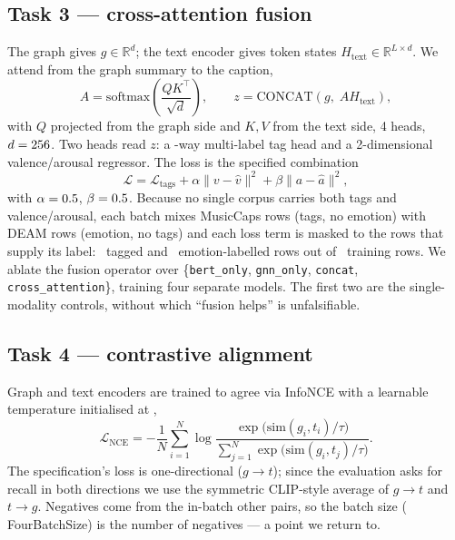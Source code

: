 \documentclass[10pt,a4paper]{article}
\begin{document}
\subsection{Task 3 --- cross-attention fusion}
The graph gives $g \in \mathbb{R}^{d}$; the text encoder gives token states
$H_{\text{text}} \in \mathbb{R}^{L \times d}$. We attend from the graph summary
to the caption,
\begin{equation}
A = \mathrm{softmax}\!\left(\frac{QK^{\top}}{\sqrt{d}}\right), \qquad
z = \mathrm{CONCAT}\!\left(g,\; A H_{\text{text}}\right),
\end{equation}
with $Q$ projected from the graph side and $K, V$ from the text side, 4 heads,
$d = 256$. Two heads read $z$: a \cfgNumTags-way multi-label tag head and a
2-dimensional valence/arousal regressor. The loss is the specified combination
\begin{equation}
\mathcal{L} = \mathcal{L}_{\text{tags}}
 + \alpha \lVert v - \hat{v} \rVert^{2}
 + \beta  \lVert a - \hat{a} \rVert^{2},
\end{equation}
with $\alpha = 0.5$, $\beta = 0.5$. Because no single corpus carries
both tags and valence/arousal, each batch mixes MusicCaps rows (tags, no emotion)
with DEAM rows (emotion, no tags) and each loss term is masked to the rows that
supply its label: \tThreeNTagTrain\ tagged and \tThreeNEmoTrain\ emotion-labelled
rows out of \tThreeNTrain\ training rows. We ablate the fusion operator over
\{\texttt{bert\_only}, \texttt{gnn\_only}, \texttt{concat},
\texttt{cross\_attention}\}, training four separate models. The first two are the
single-modality controls, without which ``fusion helps'' is unfalsifiable.

\subsection{Task 4 --- contrastive alignment}
Graph and text encoders are trained to agree via InfoNCE with a learnable
temperature initialised at \cfgTemp,
\begin{equation}
\mathcal{L}_{\text{NCE}} = -\frac{1}{N}\sum_{i=1}^{N}
\log \frac{\exp\!\big(\mathrm{sim}(g_i, t_i)/\tau\big)}
          {\sum_{j=1}^{N} \exp\!\big(\mathrm{sim}(g_i, t_j)/\tau\big)}.
\end{equation}
The specification's loss is one-directional ($g \to t$); since the evaluation
asks for recall in both directions we use the symmetric CLIP-style average of
$g \to t$ and $t \to g$. Negatives come from the in-batch other pairs, so the
batch size (	FourBatchSize) is the number of negatives --- a point we return to.
\end{document}
